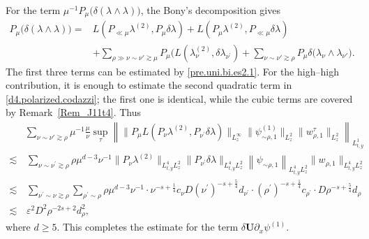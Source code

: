 \documentclass[11pt,letterpaper,reqno]{amsart}
\numberwithin{equation}{section}
\theoremstyle{definition}
\theoremstyle{remark}
\begin{document}
For the term \(\mu^{-1}P_\mu\big(  \delta(\lambda\wedge\lambda)\big)\),  the Bony's decomposition gives
\begin{align}
 P_\mu\big(  \delta(\lambda\wedge\lambda)\big)=  &  L(P_{\ll \mu} \lambda^{(2)}, P_\mu \delta \lambda)+ L(P_{ \mu} \lambda^{(2)}, P_{\ll \mu} \delta \lambda) \label{bon.delta.lam} \\
  &+ \sum_{  \rho \gg \nu\sim\nu'\gtrsim\mu}  P_\mu( L(\lambda_\nu^{(2)}, \delta\lambda_{ \nu^\prime} )+ \sum_{   \nu\sim\nu'\gtrsim\rho}  P_\mu\delta
\bigl(
\lambda_\nu\wedge\lambda_{\nu'} \nonumber
\bigr).
\end{align}
 The first three terms can be estimated by \eqref{pre.uni.bi.es2.1}. For the
high--high contribution, it is enough to estimate the second quadratic term
in \eqref{d4.polarized.codazzi}; the first one is identical, while the cubic
terms are covered by Remark~\ref{Rem_J11t4}. Thus
\begin{align*}
     &\sum_{   \nu\sim\nu'\gtrsim\rho} 
   \mu^{-1}   \frac{\mu}{\nu}  \sup_\tau\left\|\|P_\mu L (P_\nu  \lambda^{(2)}, P_{ \nu^\prime} \delta \lambda)\|_{L^\infty_z}\|\psi_{\sim\rho,1}^{(1)}\|_{L^2_z}
\|w_{\rho,1}^{\tau}\|_{L^2_z}\right\|_{L^1_{t,y}}\\
\lesssim &\, \sum_{\nu\sim \nu^\prime   \gtrsim \rho}	  \rho   \mu^{d-3} \nu^{-1}  \| P_{ \nu } \lambda^{(2)} \|_{L^4_{t,y}L^2_z}     \|P_{\nu^\prime } \delta  \lambda  \|_{L^4_{t,y}L^2_z}   \left\|   \psi_{\sim \rho,1} \right\|_{L^4_{t,y}L^2_z}   \|        w_{\rho,1} \|_{ L^4_{t,y}L^2_z}    \nonumber\\
 	\lesssim&\,  \sum_{\nu^\prime \sim \nu  \gtrsim \rho}\sum_{\rho^\prime \sim  \rho} 	 \rho \mu^{d-3}  \nu^{-1} \cdot\nu^{-s+\frac 14}c_{\nu  }  D (\nu^\prime)^{-s+\frac 54}d_{\nu^\prime }   \cdot  (\rho^\prime)^{-s+\frac 14 }c_{\rho^\prime}  \cdot D\rho^{-s+\frac 54 }d_{\rho}  \nonumber\\
 	\lesssim&\, \varepsilon^2 D^2 \rho^{-2s +2 }  d_{\rho }^2,\nonumber
\end{align*}
where \(d \geq 5.\)
This completes the estimate for the term
\(\delta \mathbf{U} \partial_x\psi^{(1)}\).
\end{document}
